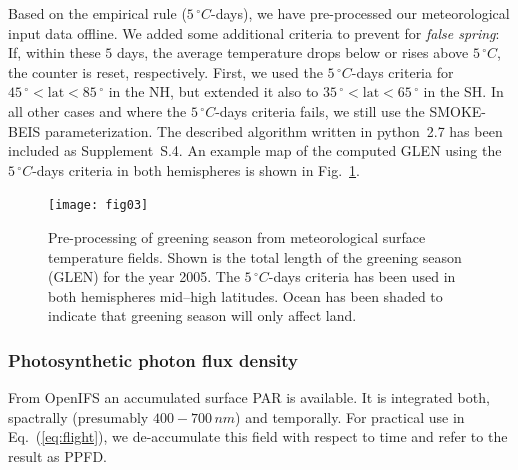 \documentclass[gmd, manuscript]{copernicus}
\begin{document}
Based on the empirical rule ($5\,\unit{^\circ C}$-days), we have pre-processed our meteorological input data offline. We added some additional criteria to prevent for \emph{false spring}: If, within these $5$ days, the average temperature drops below or rises above $5\,\unit{^\circ C}$, the counter is reset, respectively. First, we used the $5\,\unit{^\circ C}$-days criteria for $45\,\unit{^\circ} < \text{lat} < 85\,\unit{^\circ}$ in the NH, but extended it also to $35\,\unit{^\circ} < \text{lat} < 65\,\unit{^\circ}$ in the SH. In all other cases and where the $5\,\unit{^\circ C}$-days criteria fails, we still use the SMOKE-BEIS parameterization. The described algorithm written in python~2.7 has been included as Supplement~S.4. An example map of the computed GLEN using the $5\,\unit{^\circ C}$-days criteria in both hemispheres is shown in Fig.~\ref{fig:glen_2015_she}.
%
\begin{figure}[t]
  \texttt{[image: fig03]}
  \caption{Pre-processing of greening season from meteorological surface temperature fields. Shown is the total length of the greening season (GLEN) for the year 2005. The $5\,\unit{^\circ C}$-days criteria has been used in both hemispheres mid--high latitudes. Ocean has been shaded to indicate that greening season will only affect land.}
  \label{fig:glen_2015_she}
\end{figure}
%
\subsubsection{Photosynthetic photon flux density}
From OpenIFS an accumulated surface PAR is available. It is integrated both, spactrally (presumably $400-700\,\unit{nm}$) and temporally. For practical use in Eq.~(\ref{eq:flight}), we de-accumulate this field with respect to time and refer to the result as PPFD.
\end{document}
